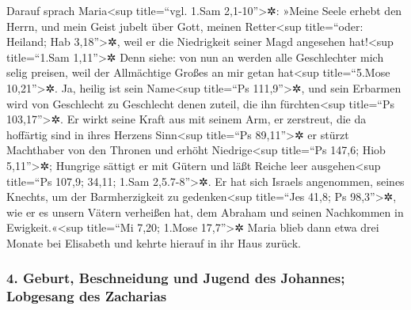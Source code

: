  Darauf sprach Maria\textless sup title=``vgl. 1.Sam
2,1-10''\textgreater✲: »Meine Seele erhebt den Herrn, 
und mein Geist jubelt über Gott, meinen Retter\textless sup
title=``oder: Heiland; Hab 3,18''\textgreater✲,  weil er
die Niedrigkeit seiner Magd angesehen hat!\textless sup title=``1.Sam
1,11''\textgreater✲ Denn siehe: von nun an werden alle Geschlechter mich
selig preisen,  weil der Allmächtige Großes an mir getan
hat\textless sup title=``5.Mose 10,21''\textgreater✲. Ja, heilig ist
sein Name\textless sup title=``Ps 111,9''\textgreater✲, 
und sein Erbarmen wird von Geschlecht zu Geschlecht denen zuteil, die
ihn fürchten\textless sup title=``Ps 103,17''\textgreater✲.
 Er wirkt seine Kraft aus mit seinem Arm, er zerstreut,
die da hoffärtig sind in ihres Herzens Sinn\textless sup title=``Ps
89,11''\textgreater✲  er stürzt Machthaber von den
Thronen und erhöht Niedrige\textless sup title=``Ps 147,6; Hiob
5,11''\textgreater✲;  Hungrige sättigt er mit Gütern und
läßt Reiche leer ausgehen\textless sup title=``Ps 107,9; 34,11; 1.Sam
2,5.7-8''\textgreater✲.  Er hat sich Israels angenommen,
seines Knechts, um der Barmherzigkeit zu gedenken\textless sup
title=``Jes 41,8; Ps 98,3''\textgreater✲,  wie er es
unsern Vätern verheißen hat, dem Abraham und seinen Nachkommen in
Ewigkeit.«\textless sup title=``Mi 7,20; 1.Mose 17,7''\textgreater✲
 Maria blieb dann etwa drei Monate bei Elisabeth und
kehrte hierauf in ihr Haus zurück.

\hypertarget{geburt-beschneidung-und-jugend-des-johannes-lobgesang-des-zacharias}{%
\subsubsection{4. Geburt, Beschneidung und Jugend des Johannes;
Lobgesang des
Zacharias}\label{geburt-beschneidung-und-jugend-des-johannes-lobgesang-des-zacharias}}

